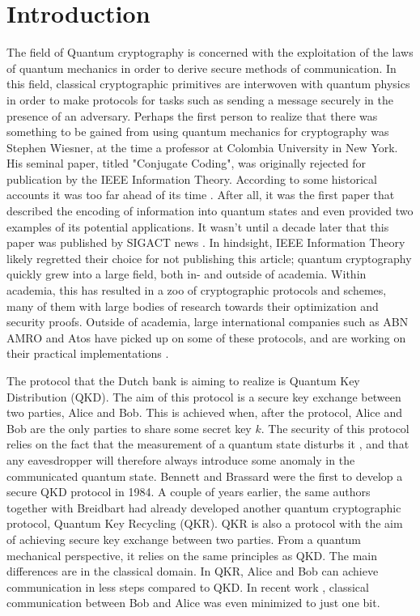 \documentclass[]{article}
\begin{document}
\section{Introduction}

The field of Quantum cryptography is concerned with the exploitation of the laws of quantum mechanics in order to derive secure methods of communication. In this field, classical cryptographic primitives are interwoven with quantum physics in order to make protocols for tasks such as sending a message securely in the presence of an adversary. Perhaps the first person to realize that there was something to be gained from using quantum mechanics for cryptography was Stephen Wiesner, at the time a professor at Colombia University in New York. His seminal paper, titled "Conjugate Coding", was originally rejected for publication by the IEEE Information Theory. According to some historical accounts it was too far ahead of its time \cite{Morsch2008}. After all, it was the first paper that described the encoding of information into quantum states and even provided two examples of its potential applications. It wasn't until a decade later that this paper was published by SIGACT news \cite{WeisnerConjugateCoding}. In hindsight, IEEE Information Theory likely regretted their choice for not publishing this article; quantum cryptography quickly grew into a large field, both in- and outside of academia. Within academia, this has resulted in a zoo of cryptographic protocols and schemes, many of them with large bodies of research towards their optimization and security proofs. Outside of academia, large international companies such as ABN AMRO and Atos have picked up on some of these protocols, and are working on their practical implementations \cite{abnamro,Buding2015}.

The protocol that the Dutch bank is aiming to realize is Quantum Key Distribution (QKD). The aim of this protocol is a secure key exchange between two parties, Alice and Bob. This is achieved when, after the protocol, Alice and Bob are the only parties to share some secret key $k$. The security of this protocol relies on the fact that the measurement of a quantum state disturbs it \cite{Lindblad1999}, and that any eavesdropper will therefore always introduce some anomaly in the communicated quantum state. Bennett and Brassard were the first to develop a secure QKD protocol in 1984. A couple of years earlier, the same authors together with Breidbart had already developed another quantum cryptographic protocol, Quantum Key Recycling (QKR). QKR is also a protocol with the aim of achieving secure key exchange between two parties. From a quantum mechanical perspective, it relies on the same principles as QKD. The main differences are in the classical domain. In QKR, Alice and Bob can achieve communication in less steps compared to QKD. In recent work \cite{cryptoeprint:2019:875}, classical communication between Bob and Alice was even minimized to just one bit. 
\end{document}
